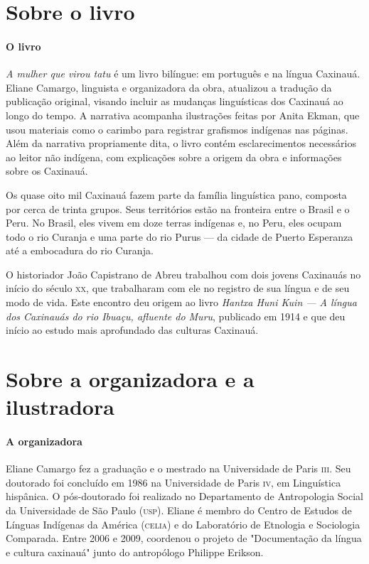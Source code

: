 \documentclass[11pt]{extarticle}
\begin{document}
\section{Sobre o livro} 

\paragraph{O livro} \textit{A mulher que virou tatu} é um livro bilíngue: em português e na língua Caxinauá. Eliane Camargo, linguista e organizadora da obra, atualizou a tradução da publicação original, visando incluir as mudanças linguísticas dos Caxinauá ao longo do tempo. A narrativa acompanha ilustrações feitas por Anita Ekman, que usou materiais como o carimbo para registrar grafismos indígenas nas páginas. Além da narrativa propriamente dita, o livro contém esclarecimentos necessários ao leitor não indígena, com explicações sobre a origem da obra e informações sobre os Caxinauá.


Os quase oito mil Caxinauá fazem parte da família linguística pano, composta por cerca de trinta grupos. Seus territórios estão na fronteira entre o Brasil e o Peru. No Brasil, eles vivem em doze terras indígenas e, no Peru, eles ocupam todo o rio Curanja e uma parte do rio Purus --- da cidade de Puerto Esperanza até a embocadura do rio Curanja. 

O historiador João Capistrano de Abreu trabalhou com dois jovens Caxinauás no início do século \textsc{xx}, que trabalharam com ele no registro de sua língua e de seu modo de vida. Este encontro deu origem ao livro \textit{Hantxa Huni Kuin --- A língua dos Caxinauás do rio Ibuaçu, afluente do Muru}, publicado em 1914 e que deu início ao estudo mais aprofundado das culturas Caxinauá. 

\section{Sobre a organizadora e a ilustradora}

\paragraph{A organizadora} Eliane Camargo fez a graduação e o mestrado na Universidade de Paris \textsc{iii}. Seu doutorado foi concluído em 1986 na Universidade de Paris \textsc{iv}, em Linguística hispânica. O pós-doutorado foi realizado no Departamento de Antropologia Social da Universidade de São Paulo (\textsc{usp}). Eliane é membro do Centro de Estudos de Línguas Indígenas da América (\textsc{celia}) e do Laboratório de Etnologia e Sociologia Comparada. Entre 2006 e 2009, coordenou o projeto de "Documentação da língua e cultura caxinauá" junto do antropólogo Philippe Erikson.
\end{document}
